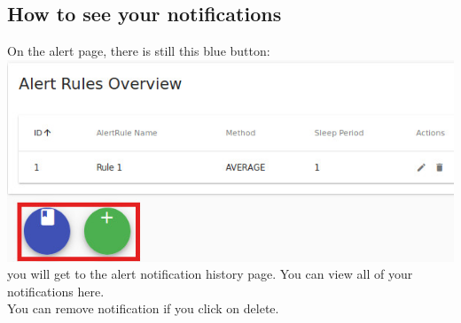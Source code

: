 \documentclass[twoside,a4paper]{refart}
\begin{document}
    \subsection{How to see your notifications}
    On the alert page, there is still this blue button: \\
    \includegraphics[width=\linewidth]{alertoverview.jpeg}
    you will get to the alert notification history page. You can view all of your notifications here.\\
    You can remove notification if you click on delete.
\end{document}
